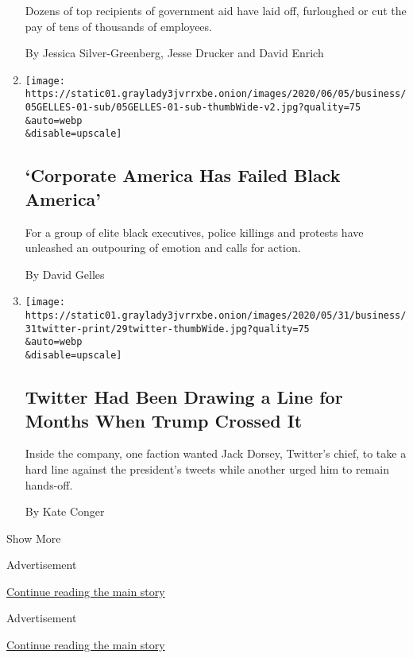 \begin{enumerate}
  Dozens of top recipients of government aid have laid off, furloughed
  or cut the pay of tens of thousands of employees.

  By Jessica Silver-Greenberg, Jesse Drucker and David Enrich
\item
  \href{/2020/06/06/business/corporate-america-has-failed-black-america.html}{}

  \texttt{[image: https://static01.graylady3jvrrxbe.onion/images/2020/06/05/business/05GELLES-01-sub/05GELLES-01-sub-thumbWide-v2.jpg?quality=75\\\&auto=webp\\\&disable=upscale]}

  \hypertarget{corporate-america-has-failed-black-america}{%
  \subsection{`Corporate America Has Failed Black
  America'}\label{corporate-america-has-failed-black-america}}

  For a group of elite black executives, police killings and protests
  have unleashed an outpouring of emotion and calls for action.

  By David Gelles
\item
  \href{/2020/05/30/technology/twitter-trump-dorsey.html}{}

  \texttt{[image: https://static01.graylady3jvrrxbe.onion/images/2020/05/31/business/31twitter-print/29twitter-thumbWide.jpg?quality=75\\\&auto=webp\\\&disable=upscale]}

  \hypertarget{twitter-had-been-drawing-a-line-for-months-when-trump-crossed-it}{%
  \subsection{Twitter Had Been Drawing a Line for Months When Trump
  Crossed
  It}\label{twitter-had-been-drawing-a-line-for-months-when-trump-crossed-it}}

  Inside the company, one faction wanted Jack Dorsey, Twitter's chief,
  to take a hard line against the president's tweets while another urged
  him to remain hands-off.

  By Kate Conger
\end{enumerate}

Show More

Advertisement

\protect\hyperlink{after-mid2}{Continue reading the main story}

Advertisement

\protect\hyperlink{after-mktg}{Continue reading the main story}

